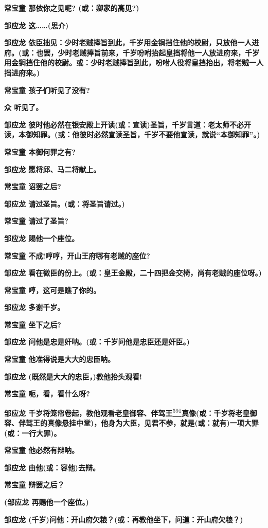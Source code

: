 \textbf{常宝童 那依你之见呢? (或：卿家的高见?)}

\textbf{邹应龙 这\ldots{}\ldots{}(思介)}

\textbf{邹应龙
依臣拙见：少时老贼捧旨到此，千岁用金锏挡住他的校尉，只放他一人进府。(或：也罢，少时老贼捧旨前来，千岁吩咐抬起皇挡将他一人放进府来，千岁用金锏挡住他的校尉。或：少时老贼捧旨到此，吩咐人役将皇挡抬出，将老贼一人挡进府来。)}

\textbf{常宝童 孩子们听见了没有?}

\textbf{众 听见了。}

\textbf{邹应龙
彼时他必然在银安殿上开读(或：宣读)圣旨，千岁言道：老太师不必开读，本御知罪。(或：他彼时必然宣读圣旨，千岁不要他宣读，就说``本御知罪''。)}

\textbf{常宝童 本御何罪之有?}

\textbf{邹应龙 愿将邱、马二将献上。}

\textbf{常宝童 诏罢之后?}

\textbf{邹应龙 请过圣旨。(或：将圣旨请过。)}

\textbf{常宝童 请过了圣旨?}

\textbf{邹应龙 赐他一个座位。}

\textbf{常宝童 不成!哼哼，开山王府哪有老贼的座位?}

\textbf{邹应龙
看在微臣的份上。(或：皇王金殿，二十四把金交椅，尚有老贼的座位呀。)}

\textbf{常宝童 哼，这可是瞧了你的。}

\textbf{邹应龙 多谢千岁。}

\textbf{常宝童 坐下之后?}

\textbf{邹应龙 问他是忠是奸呐。(或：千岁问他是忠臣还是奸臣。)}

\textbf{常宝童 他准得说是大大的忠臣呐。}

\textbf{邹应龙 (既然是大大的忠臣，)教他抬头观看!}

\textbf{常宝童 呃，看，看什么呀?}

\textbf{邹应龙
千岁将笼帘卷起，教他观看老皇御容、伴驾王}\protect\hyperlink{fn591}{\textsuperscript{591}}\textbf{真像(或：千岁将老皇御容、伴驾王的真像悬挂中堂)，他身为大臣，见君不参，就是(或：就有)一项大罪(或：一行大罪)。}

\textbf{常宝童 他必然有辩呐。}

\textbf{邹应龙 由他(或：容他)去辩。}

\textbf{常宝童 辩罢之后？}

\textbf{(邹应龙 再赐他一个座位。)}

\textbf{邹应龙
(千岁)问他：开山府欠粮？(或：再教他坐下，问道：开山府欠粮？)}


